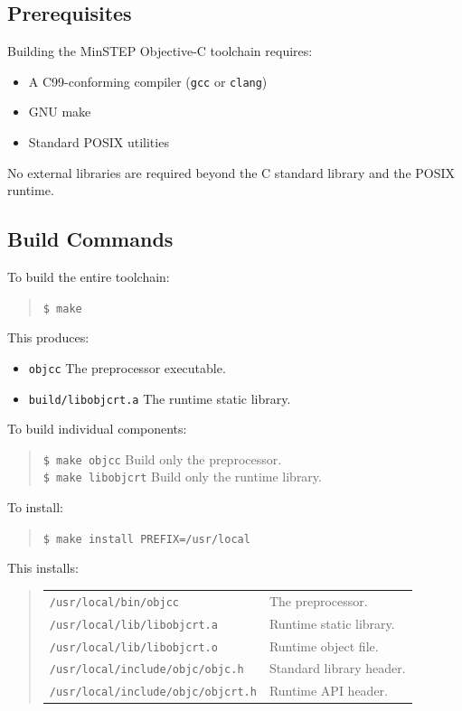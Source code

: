 \documentclass[11pt,twoside]{article}
\begin{document}
\subsection{Prerequisites}

Building the MinSTEP Objective-C toolchain requires:

\begin{itemize}
  \item A C99-conforming compiler ({\tt gcc} or {\tt clang})
  \item GNU make
  \item Standard POSIX utilities
\end{itemize}

No external libraries are required beyond the C standard library and the
POSIX runtime.

\subsection{Build Commands}

To build the entire toolchain:
\begin{quote}
{\tt \$ make}
\end{quote}

This produces:
\begin{itemize}
  \item {\tt objcc} \quad The preprocessor executable.
  \item {\tt build/libobjcrt.a} \quad The runtime static library.
\end{itemize}

To build individual components:
\begin{quote}
{\tt \$ make objcc} \quad\quad Build only the preprocessor.\\
{\tt \$ make libobjcrt} \quad Build only the runtime library.
\end{quote}

To install:
\begin{quote}
{\tt \$ make install PREFIX=/usr/local}
\end{quote}

This installs:
\begin{quote}
\begin{tabular}{ll}
{\tt /usr/local/bin/objcc} & The preprocessor. \\
{\tt /usr/local/lib/libobjcrt.a} & Runtime static library. \\
{\tt /usr/local/lib/libobjcrt.o} & Runtime object file. \\
{\tt /usr/local/include/objc/objc.h} & Standard library header. \\
{\tt /usr/local/include/objc/objcrt.h} & Runtime API header. \\
\end{tabular}
\end{quote}
\end{document}
